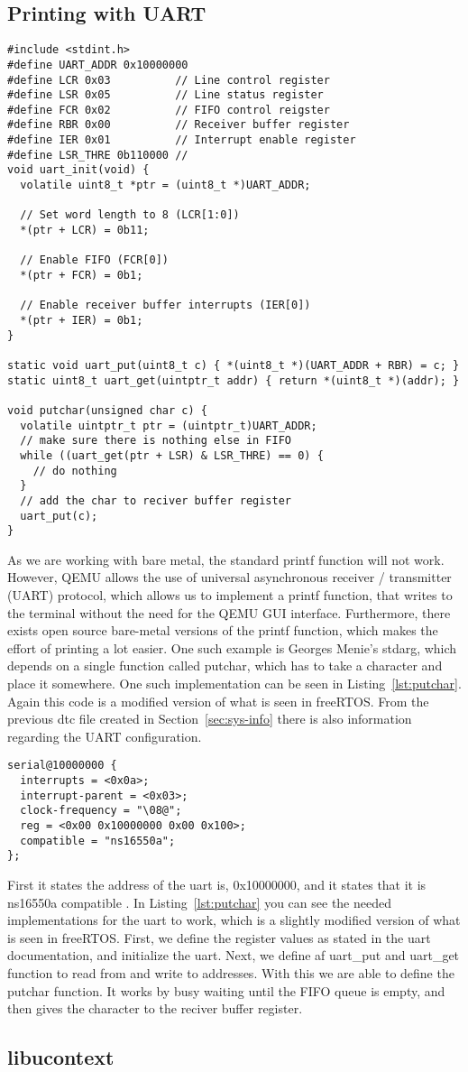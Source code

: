 \subsection{Printing with UART}
\begin{lstlisting}[float=*, label=lst:putchar, caption=Implementation of putchar of stdarg lib]
#include <stdint.h>
#define UART_ADDR 0x10000000
#define LCR 0x03          // Line control register
#define LSR 0x05          // Line status register
#define FCR 0x02          // FIFO control reigster
#define RBR 0x00          // Receiver buffer register
#define IER 0x01          // Interrupt enable register
#define LSR_THRE 0b110000 //
void uart_init(void) {
  volatile uint8_t *ptr = (uint8_t *)UART_ADDR;

  // Set word length to 8 (LCR[1:0])
  *(ptr + LCR) = 0b11;

  // Enable FIFO (FCR[0])
  *(ptr + FCR) = 0b1;

  // Enable receiver buffer interrupts (IER[0])
  *(ptr + IER) = 0b1;
}

static void uart_put(uint8_t c) { *(uint8_t *)(UART_ADDR + RBR) = c; }
static uint8_t uart_get(uintptr_t addr) { return *(uint8_t *)(addr); }

void putchar(unsigned char c) {
  volatile uintptr_t ptr = (uintptr_t)UART_ADDR;
  // make sure there is nothing else in FIFO
  while ((uart_get(ptr + LSR) & LSR_THRE) == 0) {
    // do nothing
  }
  // add the char to reciver buffer register
  uart_put(c);
}
\end{lstlisting}
As we are working with bare metal, the standard printf function will not work. However, QEMU
allows the use of universal asynchronous receiver / transmitter (UART) protocol, which allows
us to implement a printf function, that writes to the terminal without the need for the QEMU
GUI interface. Furthermore, there exists open source bare-metal versions of the printf function,
which makes the effort of printing a lot easier. One such example is Georges Menie's stdarg,
which depends on a single function called putchar, which has to take a character and place it
somewhere. One such implementation can be seen in Listing~\ref{lst:putchar}. Again this code is
a modified version of what is seen in freeRTOS. From the previous dtc file created
in Section~\ref{sec:sys-info} there is also information regarding the UART configuration.
\begin{lstlisting}
serial@10000000 {
  interrupts = <0x0a>;
  interrupt-parent = <0x03>;
  clock-frequency = "\08@";
  reg = <0x00 0x10000000 0x00 0x100>;
  compatible = "ns16550a";
};
\end{lstlisting}
First it states the address of the uart is, 0x10000000, and it states that it is ns16550a compatible \cite{uart}. In Listing~\ref{lst:putchar} you can see the needed implementations for the
uart to work, which is a slightly modified version of what is seen in freeRTOS. First,
we define the register values as stated in the uart documentation, and initialize the uart.
Next, we define af uart\_put and uart\_get function to read from and write to addresses. With this we are able to define the putchar function. It works by busy waiting until the FIFO queue is
empty, and then gives the character to the reciver buffer register.

\subsection{libucontext}

